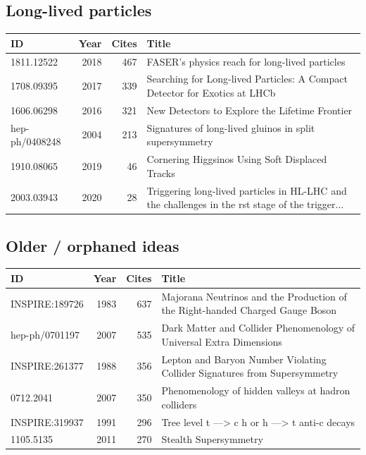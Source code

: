 \documentclass[11pt,a4paper]{article}
\begin{document}
\subsection*{Long-lived particles}
\begin{center}\footnotesize\begin{tabular}{@{}p{2.5cm}rr p{9cm}@{}}\toprule ID & Year & Cites & Title\\\midrule
1811.12522 & 2018 & 467 & FASER's physics reach for long-lived particles\\
1708.09395 & 2017 & 339 & Searching for Long-lived Particles: A Compact Detector for Exotics at LHCb\\
1606.06298 & 2016 & 321 & New Detectors to Explore the Lifetime Frontier\\
hep-ph/0408248 & 2004 & 213 & Signatures of long-lived gluinos in split supersymmetry\\
1910.08065 & 2019 & 46 & Cornering Higgsinos Using Soft Displaced Tracks\\
2003.03943 & 2020 & 28 & Triggering long-lived particles in HL-LHC and the challenges in the rst stage of the trigger...\\
\bottomrule\end{tabular}\end{center}
\subsection*{Older / orphaned ideas}
\begin{center}\footnotesize\begin{tabular}{@{}p{2.5cm}rr p{9cm}@{}}\toprule ID & Year & Cites & Title\\\midrule
INSPIRE:189726 & 1983 & 637 & Majorana Neutrinos and the Production of the Right-handed Charged Gauge Boson\\
hep-ph/0701197 & 2007 & 535 & Dark Matter and Collider Phenomenology of Universal Extra Dimensions\\
INSPIRE:261377 & 1988 & 356 & Lepton and Baryon Number Violating Collider Signatures from Supersymmetry\\
0712.2041 & 2007 & 350 & Phenomenology of hidden valleys at hadron colliders\\
INSPIRE:319937 & 1991 & 296 & Tree level t ---> c h or h ---> t anti-c decays\\
1105.5135 & 2011 & 270 & Stealth Supersymmetry\\
\bottomrule\end{tabular}\end{center}
\end{document}
